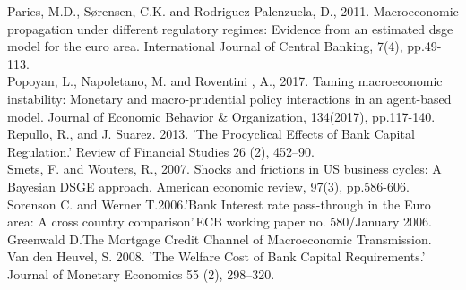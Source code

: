 \documentclass[12pt]{article}
\numberwithin{equation}{section}
\begin{document}
Paries, M.D., Sørensen, C.K. and Rodriguez-Palenzuela, D., 2011. Macroeconomic propagation under different regulatory regimes: Evidence from an estimated dsge model for the euro area. International Journal of Central Banking, 7(4), pp.49-113. \\

Popoyan, L., Napoletano, M. and Roventini , A., 2017. Taming macroeconomic instability: Monetary and
macro-prudential policy interactions in an agent-based
model. Journal of Economic Behavior \& Organization, 134(2017), pp.117-140. \\

Repullo, R., and J. Suarez. 2013. 'The Procyclical Effects of Bank
Capital Regulation.' Review of Financial Studies 26 (2), 452–90.\\

Smets, F. and Wouters, R., 2007. Shocks and frictions in US business cycles: A Bayesian DSGE approach. American economic review, 97(3), pp.586-606. \\

Sorenson C. and Werner T.2006.'Bank Interest rate pass-through in the Euro area: A cross country comparison'.ECB working paper no. 580/January 2006.\\

Greenwald D.The Mortgage Credit Channel of
Macroeconomic Transmission.\\

Van den Heuvel, S. 2008. 'The Welfare Cost of Bank Capital
Requirements.' Journal of Monetary Economics 55 (2), 298–320.\\
\end{document}
